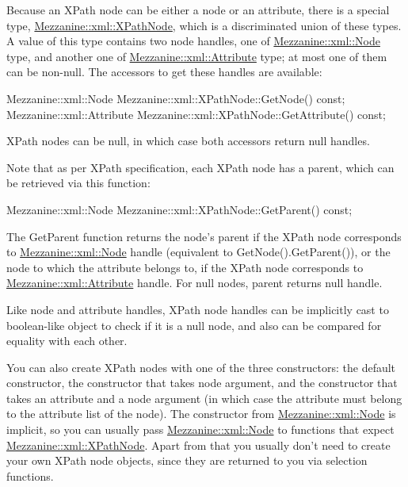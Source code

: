  \par
 Because an XPath node can be either a node or an attribute, there is a special type, \hyperlink{classMezzanine_1_1xml_1_1XPathNode}{Mezzanine::xml::XPathNode}, which is a discriminated union of these types. A value of this type contains two node handles, one of \hyperlink{classMezzanine_1_1xml_1_1Node}{Mezzanine::xml::Node} type, and another one of \hyperlink{classMezzanine_1_1xml_1_1Attribute}{Mezzanine::xml::Attribute} type; at most one of them can be non-\/null. The accessors to get these handles are available: 
\begin{DoxyCode}
 Mezzanine::xml::Node Mezzanine::xml::XPathNode::GetNode() const;
 Mezzanine::xml::Attribute Mezzanine::xml::XPathNode::GetAttribute() const;
\end{DoxyCode}
 XPath nodes can be null, in which case both accessors return null handles. \par
 \par
 Note that as per XPath specification, each XPath node has a parent, which can be retrieved via this function: 
\begin{DoxyCode}
 Mezzanine::xml::Node Mezzanine::xml::XPathNode::GetParent() const;
\end{DoxyCode}
 The GetParent function returns the node's parent if the XPath node corresponds to \hyperlink{classMezzanine_1_1xml_1_1Node}{Mezzanine::xml::Node} handle (equivalent to GetNode().GetParent()), or the node to which the attribute belongs to, if the XPath node corresponds to \hyperlink{classMezzanine_1_1xml_1_1Attribute}{Mezzanine::xml::Attribute} handle. For null nodes, parent returns null handle. \par
 \par
 Like node and attribute handles, XPath node handles can be implicitly cast to boolean-\/like object to check if it is a null node, and also can be compared for equality with each other. \par
 \par
 You can also create XPath nodes with one of the three constructors: the default constructor, the constructor that takes node argument, and the constructor that takes an attribute and a node argument (in which case the attribute must belong to the attribute list of the node). The constructor from \hyperlink{classMezzanine_1_1xml_1_1Node}{Mezzanine::xml::Node} is implicit, so you can usually pass \hyperlink{classMezzanine_1_1xml_1_1Node}{Mezzanine::xml::Node} to functions that expect \hyperlink{classMezzanine_1_1xml_1_1XPathNode}{Mezzanine::xml::XPathNode}. Apart from that you usually don't need to create your own XPath node objects, since they are returned to you via selection functions. \par
